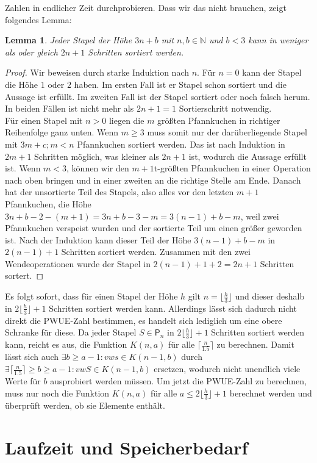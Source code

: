 \documentclass[a4paper,10pt,ngerman]{scrartcl}
\newtheorem{lemma}[theorem]{Lemma}
\begin{document}
Zahlen in endlicher Zeit durchprobieren. Dass wir das nicht brauchen, zeigt folgendes Lemma:
\begin{lemma}
  Jeder Stapel der Höhe $3n+b$ mit $n,b\in \mathbb{N}$ und $b<3$ kann in weniger als oder gleich $2n+1$ Schritten sortiert werden.
\end{lemma}
\begin{proof}
  Wir beweisen durch starke Induktion nach $n$. Für $n=0$ kann der Stapel die Höhe $1$ oder $2$ haben. Im ersten Fall ist er Stapel schon sortiert
  und die Aussage ist erfüllt. Im zweiten Fall ist der Stapel sortiert oder noch falsch herum. In beiden Fällen ist nicht mehr als $2n+1=1$ Sortierschritt
  notwendig. \\
  Für einen Stapel mit $n>0$ liegen die $m$ größten Pfannkuchen in richtiger Reihenfolge ganz unten. Wenn $m\geq3$ muss somit nur der darüberliegende Stapel mit $3m+c;m<n$ Pfannkuchen
  sortiert werden. Das ist nach Induktion in $2m+1$ Schritten möglich, was kleiner als $2n+1$ ist, wodurch die Aussage erfüllt ist. Wenn $m<3$, können wir den $m+1$t-größten Pfannkuchen
  in einer Operation nach oben bringen und in einer zweiten an die richtige Stelle am Ende. Danach hat der unsortierte Teil des Stapels, also alles vor den letzten $m+1$ Pfannkuchen,
  die Höhe $3n+b-2-(m+1)=3n+b-3-m=3(n-1)+b-m$, weil zwei Pfannkuchen verspeist wurden und der sortierte Teil um einen größer geworden ist. Nach der Induktion kann dieser Teil der Höhe
  $3(n-1)+b-m$ in $2(n-1)+1$ Schritten sortiert werden. Zusammen mit den zwei Wendeoperationen wurde der Stapel in $2(n-1)+1+2=2n+1$ Schritten sortert.
\end{proof}
Es folgt sofort, dass für einen Stapel der Höhe $h$ gilt $n=\lfloor\frac{h}{3}\rfloor$ und dieser deshalb in $2\lfloor\frac{h}{3}\rfloor+1$ Schritten sortiert werden kann.
Allerdings lässt sich dadurch nicht direkt die PWUE-Zahl bestimmen, es handelt sich lediglich um eine obere Schranke für diese.
Da jeder Stapel $S \in \mathsf{P}_n$ in $2\lfloor\frac{h}{3}\rfloor+1$ Schritten sortiert werden kann, reicht es aus, 
die Funktion $K(n,a)$ für alle $\lceil \frac{n}{1.5}\rceil$ zu berechnen.
Damit lässt sich auch $\exists b \geq a-1: vws \in K(n-1,b)$ durch $\exists \lceil \frac{n}{1.5}\rceil \geq b \geq a-1: vwS \in K(n-1,b)$ 
ersetzen, wodurch nicht unendlich viele Werte für $b$
ausprobiert werden müssen.
Um jetzt die PWUE-Zahl zu berechnen, muss nur noch die Funktion $K(n,a)$ für alle $a \leq 2\lfloor\frac{h}{3}\rfloor+1$ 
berechnet werden und überprüft werden, ob sie Elemente enthält.
\section{Laufzeit und Speicherbedarf}
\end{document}
